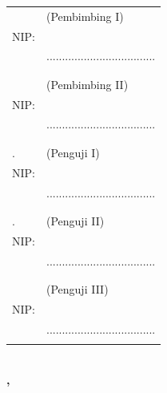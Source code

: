 \noindent
\begin{tabularx}{\textwidth}{X l}
  \advisor{}               & (Pembimbing I)                      \\
  NIP: \advisornip{}       &                                     \\
                           & ................................... \\
                           &                                     \\
                           &                                     \\
  \coadvisor{}             & (Pembimbing II)                     \\
  NIP: \coadvisornip{}     &                                     \\
                           & ................................... \\
                           &                                     \\
                           &                                     \\
  \examinerone{}.          & (Penguji I)                         \\
  NIP: \examineronenip{}   &                                     \\
                           & ................................... \\
                           &                                     \\
                           &                                     \\
  \examinertwo{}.          & (Penguji II)                        \\
  NIP: \examinertwonip{}   &                                     \\
                           & ................................... \\
                           &                                     \\
                           &                                     \\
\ifbool{bpenguji3}{
  \examinerthree{}.        & (Penguji III)                       \\
  NIP: \examinerthreenip{} &                                     \\
                          & ................................... \\
}


\end{tabularx}
\endgroup


\vspace{-1ex}
\begin{center}
  \textbf{\MakeUppercase{\place{}}\\\MONTH{}, \the\year{}}
\end{center}
\endgroup
